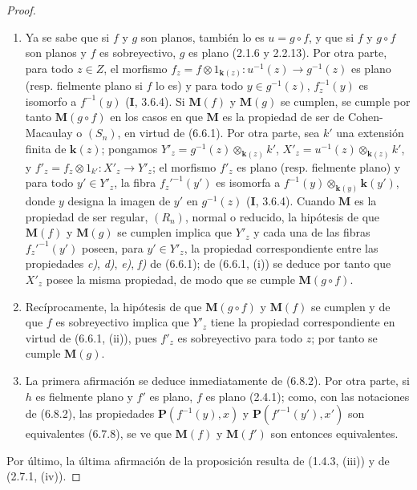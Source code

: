 \begin{proof}
\begin{enumerate}
\item[(i)] Ya se sabe que si $f$ y $g$ son planos, también lo es
$u=g\circ f$, y que si $f$ y $g\circ f$ son planos y $f$ es sobreyectivo, $g$ es
plano (2.1.6 y 2.2.13). Por otra parte, para todo $z\in Z$, el morfismo
$f_z=f\otimes1_{\mathbf{k}(z)}:u^{-1}(z)\to g^{-1}(z)$ es plano (resp.
fielmente plano si $f$ lo es) y para todo $y\in g^{-1}(z)$,
$f_z^{-1}(y)$ es isomorfo a $f^{-1}(y)$ (\textbf I, 3.6.4). Si $\boldsymbol{M}(f)$ y $\boldsymbol{M}(g)$
se cumplen, se cumple por tanto $\boldsymbol{M}(g\circ f)$ en los casos en que $\boldsymbol{M}$ es la propiedad
de ser de Cohen-Macaulay o $(S_n)$, en virtud de (6.6.1). Por otra parte, sea
$k'$ una extensión finita de $\boldsymbol{k}(z)$; pongamos
$Y'_z=g^{-1}(z)\otimes_{\mathbf{k}(z)}k'$, $X'_z=u^{-1}(z)\otimes_{\mathbf{k}(z)}k'$, y
$f'_z=f_z\otimes1_{k'}:X'_z\to Y'_z$; el morfismo $f'_z$
es plano
(resp. fielmente plano) y para todo $y'\in Y'_z$, la fibra $f_z'^{-1}(y')$
es isomorfa a $f^{-1}(y)\otimes_{\mathbf{k}(y)}\boldsymbol{k}(y')$, donde $y$ designa la imagen
de $y'$ en $g^{-1}(z)$ (\textbf I, 3.6.4). Cuando $\boldsymbol{M}$ es la propiedad de ser
regular, $(R_n)$, normal o reducido, la hipótesis de que $\boldsymbol{M}(f)$ y $\boldsymbol{M}(g)$
se cumplen implica que $Y'_z$ y cada una de las fibras $f_z'^{-1}(y')$ poseen,
para $y'\in Y'_z$, la propiedad correspondiente entre las propiedades \emph{c)}, \emph{d)},
\emph{e)}, \emph{f)} de (6.6.1); de (6.6.1, (i)) se deduce por tanto que $X'_z$ posee la misma
propiedad, de modo que se cumple $\boldsymbol{M}(g\circ f)$.
\item[(ii)] Recíprocamente, la hipótesis de que $\boldsymbol{M}(g\circ f)$ y $\boldsymbol{M}(f)$ se cumplen
y de que $f$ es sobreyectivo implica que $Y'_z$ tiene la propiedad correspondiente en
virtud de (6.6.1, (ii)), pues $f'_z$ es sobreyectivo para todo $z$; por tanto se cumple
$\boldsymbol{M}(g)$.
\item[(iii)] La primera afirmación se deduce inmediatamente de (6.8.2). Por otra parte,
si $h$ es fielmente plano y $f'$ es plano, $f$ es plano (2.4.1); como, con las
notaciones de (6.8.2), las propiedades $\boldsymbol{P}(f^{-1}(y),x)$ y
$\boldsymbol{P}(f'^{-1}(y'),x')$ son equivalentes (6.7.8), se ve que $\boldsymbol{M}(f)$ y $\boldsymbol{M}(f')$
son entonces equivalentes.
\end{enumerate}
Por último, la última afirmación de la proposición resulta de (1.4.3, (iii)) y
de (2.7.1, (iv)).
\end{proof}
